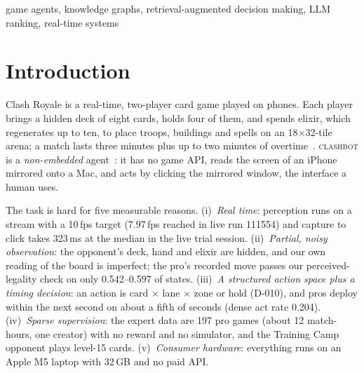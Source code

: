 \documentclass[conference]{IEEEtran}
\newcommand{\cb}{\textsc{clashbot}}
\begin{document}
\begin{IEEEkeywords}
game agents, knowledge graphs, retrieval-augmented decision making, LLM ranking, real-time systems
\end{IEEEkeywords}

\section{Introduction}

Clash Royale is a real-time, two-player card game played on phones. Each player brings a hidden deck of eight cards, holds four of them, and spends elixir, which regenerates up to ten, to place troops, buildings and spells on an 18$\times$32-tile arena; a match lasts three minutes plus up to two minutes of overtime~\cite{wu2025nonembedded}. %
\cb{} is a \emph{non-embedded} agent~\cite{wu2025nonembedded}: it has no game API, reads the screen of an iPhone mirrored onto a Mac, and acts by clicking the mirrored window, the interface a human uses.

The task is hard for five measurable reasons. (i)~\emph{Real time}: perception runs on a stream with a 10\,fps target (7.97\,fps reached in live run 111554) and capture to click takes 323\,ms at the median in the live trial session. %
(ii)~\emph{Partial, noisy observation}: the opponent's deck, hand and elixir are hidden, and our own reading of the board is imperfect; the pro's recorded move passes our perceived-legality check on only 0.542--0.597 of states. %
(iii)~\emph{A structured action space plus a timing decision}: an action is card $\times$ lane $\times$ zone or hold (D-010), and pros deploy within the next second on about a fifth of seconds (dense act rate 0.204). %
(iv)~\emph{Sparse supervision}: the expert data are 197 pro games (about 12 match-hours, one creator) with no reward and no simulator, and the Training Camp opponent plays level-15 cards. %
(v)~\emph{Consumer hardware}: everything runs on an Apple M5 laptop with 32\,GB and no paid API. %
\end{document}
